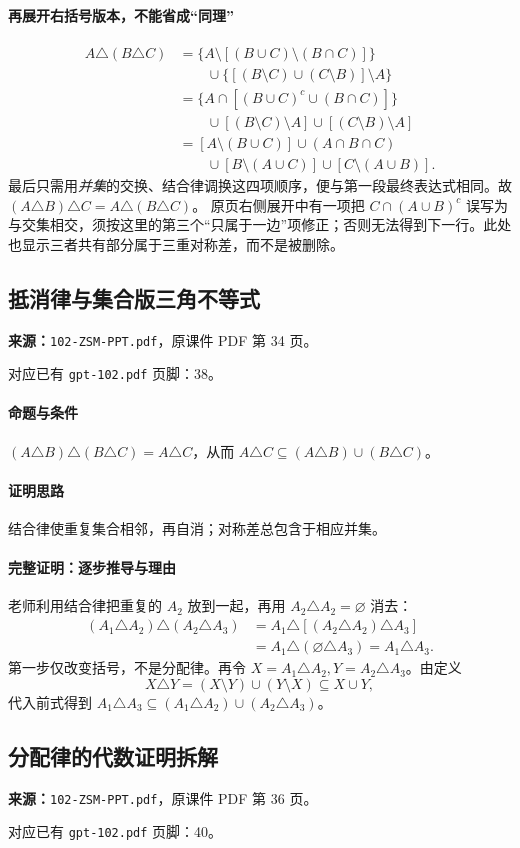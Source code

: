 \paragraph{再展开右括号版本，不能省成“同理”}
\begin{align*}
A\triangle(B\triangle C)
&=\{A\setminus[(B\cup C)\setminus(B\cap C)]\}\\
&\qquad\cup\{[(B\setminus C)\cup(C\setminus B)]\setminus A\}\\
&=\{A\cap[(B\cup C)^c\cup(B\cap C)]\}\\
&\qquad\cup[(B\setminus C)\setminus A]\cup[(C\setminus B)\setminus A]\\
&=[A\setminus(B\cup C)]\cup(A\cap B\cap C)\\
&\qquad\cup[B\setminus(A\cup C)]\cup[C\setminus(A\cup B)].
\end{align*}
最后只需用\emph{并集}的交换、结合律调换这四项顺序，便与第一段最终表达式相同。故 $(A\triangle B)\triangle C=A\triangle(B\triangle C)$。
原页右侧展开中有一项把 $C\cap (A\cup B)^c$ 误写为与交集相交，须按这里的第三个“只属于一边”项修正；否则无法得到下一行。此处也显示三者共有部分属于三重对称差，而不是被删除。

\clearpage\subsection{抵消律与集合版三角不等式}
\textbf{来源：}\texttt{102-ZSM-PPT.pdf}，原课件 PDF 第 34 页。\par
对应已有 \texttt{gpt-102.pdf} 页脚：38。\par
\paragraph{命题与条件}$(A\triangle B)\triangle(B\triangle C)=A\triangle C$，从而 $A\triangle C\subseteq(A\triangle B)\cup(B\triangle C)$。
\paragraph{证明思路}结合律使重复集合相邻，再自消；对称差总包含于相应并集。
\paragraph{完整证明：逐步推导与理由}
老师利用结合律把重复的 $A_2$ 放到一起，再用 $A_2\triangle A_2=\varnothing$ 消去：
\begin{align*}
(A_1\triangle A_2)\triangle(A_2\triangle A_3)
&=A_1\triangle[(A_2\triangle A_2)\triangle A_3]\\
&=A_1\triangle(\varnothing\triangle A_3)=A_1\triangle A_3.
\end{align*}
第一步仅改变括号，不是分配律。再令 $X=A_1\triangle A_2,Y=A_2\triangle A_3$。由定义
\[X\triangle Y=(X\setminus Y)\cup(Y\setminus X)\subseteq X\cup Y,\]
代入前式得到 $A_1\triangle A_3\subseteq(A_1\triangle A_2)\cup(A_2\triangle A_3)$。
\clearpage\subsection{分配律的代数证明拆解}
\textbf{来源：}\texttt{102-ZSM-PPT.pdf}，原课件 PDF 第 36 页。\par
对应已有 \texttt{gpt-102.pdf} 页脚：40。\par
